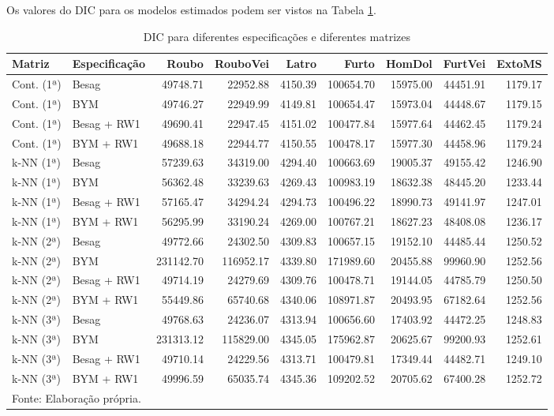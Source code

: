 \documentclass[12pt,openright,oneside,a4paper,english,french,spanish]{abntex2}
\numberwithin{table}{section} %
\numberwithin{figure}{section} %
\begin{document}
Os valores do DIC para os modelos estimados podem ser vistos na Tabela \ref{tab:DIC}.

\begin{table}[H]
\begin{center}
\begin{tiny}
\caption{DIC para diferentes especificações e diferentes matrizes}
\label{tab:DIC}
\centering
\begin{tabular}{llrrrrrrr}
  \hline
Matriz & Especificação & Roubo & RouboVei & Latro & Furto & HomDol & FurtVei & ExtoMS \\ 
  \hline
Cont. (1ª) & Besag & 49748.71 & 22952.88 & 4150.39 & 100654.70 & 15975.00 & 44451.91 & 1179.17 \\ 
Cont. (1ª) & BYM & 49746.27 & 22949.99 & 4149.81 & 100654.47 & 15973.04 & 44448.67 & 1179.15 \\ 
Cont. (1ª) & Besag + RW1 & 49690.41 & 22947.45 & 4151.02 & 100477.84 & 15977.64 & 44462.45 & 1179.24 \\ 
Cont. (1ª) & BYM + RW1 & 49688.18 & 22944.77 & 4150.55 & 100478.17 & 15977.30 & 44458.96 & 1179.24 \\ 
k-NN (1ª) & Besag & 57239.63 & 34319.00 & 4294.40 & 100663.69 & 19005.37 & 49155.42 & 1246.90 \\ 
k-NN (1ª) & BYM & 56362.48 & 33239.63 & 4269.43 & 100983.19 & 18632.38 & 48445.20 & 1233.44 \\ 
k-NN (1ª) & Besag + RW1 & 57165.47 & 34294.24 & 4294.73 & 100496.22 & 18990.73 & 49141.97 & 1247.01 \\ 
k-NN (1ª) & BYM + RW1 & 56295.99 & 33190.24 & 4269.00 & 100767.21 & 18627.23 & 48408.08 & 1236.17 \\ 
k-NN (2ª) & Besag & 49772.66 & 24302.50 & 4309.83 & 100657.15 & 19152.10 & 44485.44 & 1250.52 \\ 
k-NN (2ª) & BYM & 231142.70 & 116952.17 & 4339.80 & 171989.60 & 20455.88 & 99960.90 & 1252.56 \\ 
k-NN (2ª) & Besag + RW1 & 49714.19 & 24279.69 & 4309.76 & 100478.71 & 19144.05 & 44785.79 & 1250.50 \\ 
k-NN (2ª) & BYM + RW1 & 55449.86 & 65740.68 & 4340.06 & 108971.87 & 20493.95 & 67182.64 & 1252.56 \\ 
k-NN (3ª) & Besag & 49768.63 & 24236.07 & 4313.94 & 100656.60 & 17403.92 & 44472.25 & 1248.83 \\ 
k-NN (3ª) & BYM & 231313.12 & 115829.00 & 4345.05 & 175962.87 & 20625.67 & 99200.93 & 1252.61 \\ 
k-NN (3ª) & Besag + RW1 & 49710.14 & 24229.56 & 4313.71 & 100479.81 & 17349.44 & 44482.71 & 1249.10 \\ 
k-NN (3ª) & BYM + RW1 & 49996.59 & 65035.74 & 4345.36 & 109202.52 & 20705.62 & 67400.28 & 1252.72 \\ 
   \hline
\multicolumn{9}{l}{Fonte: Elaboração própria.}
\end{tabular}
\end{tiny}
\end{center}
\end{table}
\end{document}
